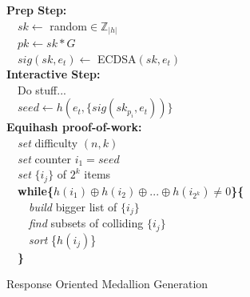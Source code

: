 \begin{algorithm}[H]

  
  \textbf{Prep Step:}\\
    ~~$sk\gets$ random$\in \mathbb{Z}_{|h|}$\\
    ~~$pk\gets sk*G$\\
    ~~$sig(sk,e_t)\gets$ ECDSA$(sk,e_t)$\\
   \textbf{Interactive Step:}\\
   ~~Do stuff...\\
    ~~$seed\gets h(e_t, \{sig(sk_{p_i},e_t))\}$ \\
  \textbf{Equihash proof-of-work:}\\
    ~~\textit{set} difficulty $(n,k)$\\
    ~~\textit{set} counter $i_1 = seed$\\
    ~~\textit{set} $\{i_j\}$ of $2^k$ items\\
    ~~\textbf{while\{}$h(i_1) \oplus h(i_2) \oplus ...\oplus h(i_{2^k}) \neq 0$\textbf{\}\{}\\
     ~~~~\textit{build} bigger list of $\{i_j\}$\\
     ~~~~\textit{find} subsets of colliding $\{i_j\}$\\
     ~~~~\textit{sort} \{$h(i_j)$\}\\
    ~~\textbf{\}}\\
    
   \caption{Response Oriented Medallion Generation}
\end{algorithm}

%

\clearpage